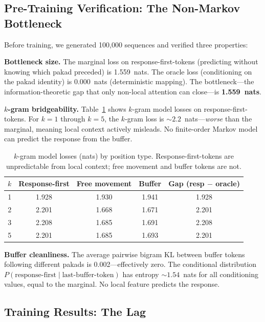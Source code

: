 \documentclass[11pt,a4paper]{article}
\begin{document}
\subsection{Pre-Training Verification: The Non-Markov Bottleneck}

Before training, we generated 100,000 sequences and verified three properties:

\textbf{Bottleneck size.} The marginal loss on response-first-tokens (predicting without knowing which pakad preceded) is 1.559~nats. The oracle loss (conditioning on the pakad identity) is 0.000~nats (deterministic mapping). The bottleneck---the information-theoretic gap that only non-local attention can close---is \textbf{1.559~nats}.

\textbf{$k$-gram bridgeability.} Table~\ref{tab:ngram} shows $k$-gram model losses on response-first-tokens. For $k = 1$ through $k = 5$, the $k$-gram loss is ${\sim}2.2$~nats---\emph{worse} than the marginal, meaning local context actively misleads. No finite-order Markov model can predict the response from the buffer.

\begin{table}[H]
\centering
\caption{$k$-gram model losses (nats) by position type. Response-first-tokens are unpredictable from local context; free movement and buffer tokens are not.}
\label{tab:ngram}
\begin{tabular}{rcccc}
\toprule
$k$ & Response-first & Free movement & Buffer & Gap (resp $-$ oracle) \\
\midrule
1 & 1.928 & 1.930 & 1.941 & 1.928 \\
2 & 2.201 & 1.668 & 1.671 & 2.201 \\
3 & 2.208 & 1.685 & 1.691 & 2.208 \\
5 & 2.201 & 1.685 & 1.693 & 2.201 \\
\bottomrule
\end{tabular}
\end{table}

\textbf{Buffer cleanliness.} The average pairwise bigram KL between buffer tokens following different pakads is 0.002---effectively zero. The conditional distribution $P(\text{response-first} \mid \text{last-buffer-token})$ has entropy ${\sim}1.54$~nats for all conditioning values, equal to the marginal. No local feature predicts the response.

\subsection{Training Results: The Lag}
\end{document}
